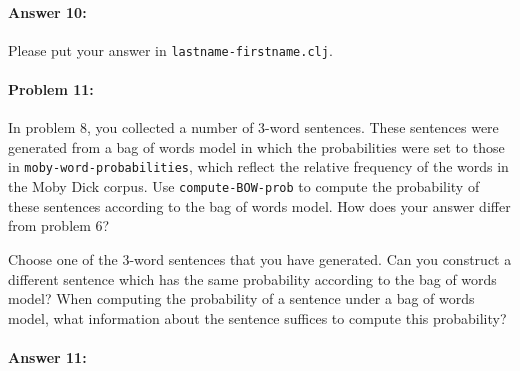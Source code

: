 \documentclass[10pt]{article}
\begin{document}
\paragraph{Answer 10:} Please put your answer in
\texttt{lastname-firstname.clj}.

\hrulefill
\paragraph{Problem 11:}

In problem 8, you collected a number of 3-word sentences. These
sentences were generated from a bag of words model in which the
probabilities were set to those in \texttt{moby-word-probabilities},
which reflect the relative frequency of the words in the Moby Dick
corpus. Use \texttt{compute-BOW-prob} to compute the probability of
these sentences according to the bag of words model. How does your
answer differ from problem 6?

Choose one of the 3-word sentences that you have generated. Can you
construct a different sentence which has the same probability
according to the bag of words model? When computing the probability of
a sentence under a bag of words model, what information about the
sentence suffices to compute this probability?

\paragraph{Answer 11:} 
\end{document}

